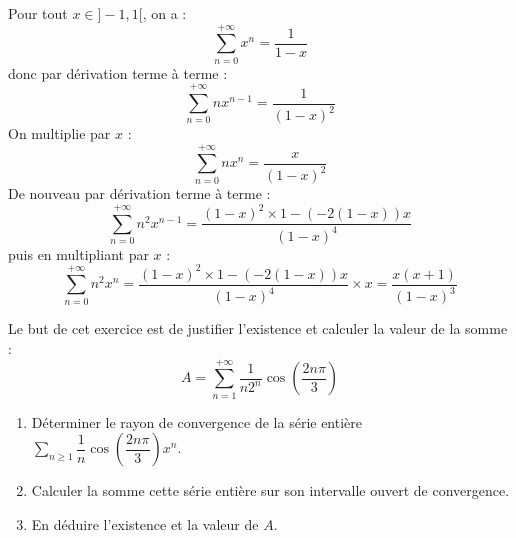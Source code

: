 \documentclass[a4paper,10pt]{report}
\newcommand{\Sum}[2]{\ensuremath{\textstyle{\sum\limits_{#1}^{#2}}}}
\begin{document}
\medskip

\noindent Pour tout $x \in ]-1,1[$, on a :
$$ \sum_{n=0}^{+\infty}x^n  =  \dfrac{1}{1-x} $$
donc par dérivation terme à terme :
$$ \sum_{n=0}^{+\infty} nx^{n-1}  =  \dfrac{1}{(1-x)^2} $$
On multiplie par $x$ :
$$ \sum_{n=0}^{+\infty} nx^{n}  =  \dfrac{x}{(1-x)^2} $$
De nouveau par dérivation terme à terme :
$$ \sum_{n=0}^{+\infty} n^2 x^{n-1} = \dfrac{(1-x)^2\times 1-(-2(1-x))x}{(1-x)^4}$$
puis en multipliant par $x$ :
$$ \sum_{n=0}^{+\infty} n^2 x^{n}= \dfrac{(1-x)^2\times 1-(-2(1-x))x}{(1-x)^4} \times x  = \dfrac{x(x+1)}{(1-x)^3}$$

\begin{Exa}[\ding{80}] Le but de cet exercice est de justifier l'existence et calculer la valeur de la somme :  
\[
A=\sum_{n=1}^{+\infty}\dfrac{1}{n2^n}\cos\left(\dfrac{2n\pi}{3}\right)
\]
\begin{enumerate}
\item Déterminer le rayon de convergence de la série entière $\Sum{n \geq 1}{} \dfrac{1}{n}\cos\left(\dfrac{2n\pi}{3}\right)x^n$.
\item Calculer la somme cette série entière sur son intervalle ouvert de convergence.
\item En déduire l'existence et la valeur de $A$.
\end{enumerate}
\end{Exa}

\corr 
\end{document}
